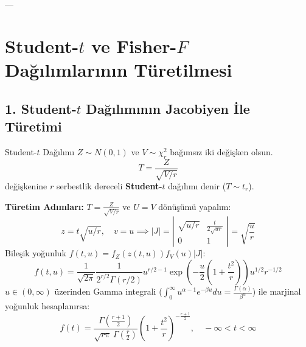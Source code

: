 \documentclass[12pt,a4paper]{article}
\begin{document}
---

\section{\texorpdfstring{Student-$t$}{Student-t} ve \texorpdfstring{Fisher-$F$}{Fisher-F} Dağılımlarının Türetilmesi}

\subsection{1. \texorpdfstring{Student-$t$}{Student-t} Dağılımının Jacobiyen İle Türetimi}

\begin{tanim}{Student-$t$ Dağılımı}
$Z \sim N(0, 1)$ ve $V \sim \chi^2_r$ bağımsız iki değişken olsun.  
\begin{equation}
    T = \frac{Z}{\sqrt{V/r}}
\end{equation}
değişkenine $r$ serbestlik dereceli \textbf{Student-$t$} dağılımı denir ($T \sim t_r$).
\end{tanim}

\textbf{Türetim Adımları:}  
$T = \frac{Z}{\sqrt{V/r}}$ ve $U = V$ dönüşümü yapalım:
\begin{equation}
    z = t \sqrt{u/r}, \quad v = u \implies |J| = \left| \begin{matrix} \sqrt{u/r} & \frac{t}{2\sqrt{ur}} \\ 0 & 1 \end{matrix} \right| = \sqrt{\frac{u}{r}}
\end{equation}
Bileşik yoğunluk $f(t, u) = f_Z(z(t, u)) f_V(u) |J|$:
\begin{equation}
    f(t, u) = \frac{1}{\sqrt{2\pi}} \frac{1}{2^{r/2}\Gamma(r/2)} u^{r/2 - 1} \exp\left( -\frac{u}{2}\left( 1 + \frac{t^2}{r} \right) \right) u^{1/2} r^{-1/2}
\end{equation}
$u \in (0, \infty)$ üzerinden Gamma integrali ($\int_0^\infty u^{\alpha-1} e^{-\beta u} du = \frac{\Gamma(\alpha)}{\beta^\alpha}$) ile marjinal yoğunluk hesaplanırsa:
\begin{equation}
    \boxed{f(t) = \frac{\Gamma\left(\frac{r+1}{2}\right)}{\sqrt{r\pi} \, \Gamma\left(\frac{r}{2}\right)} \left( 1 + \frac{t^2}{r} \right)^{-\frac{r+1}{2}}, \quad -\infty < t < \infty}
\end{equation}
\end{document}
